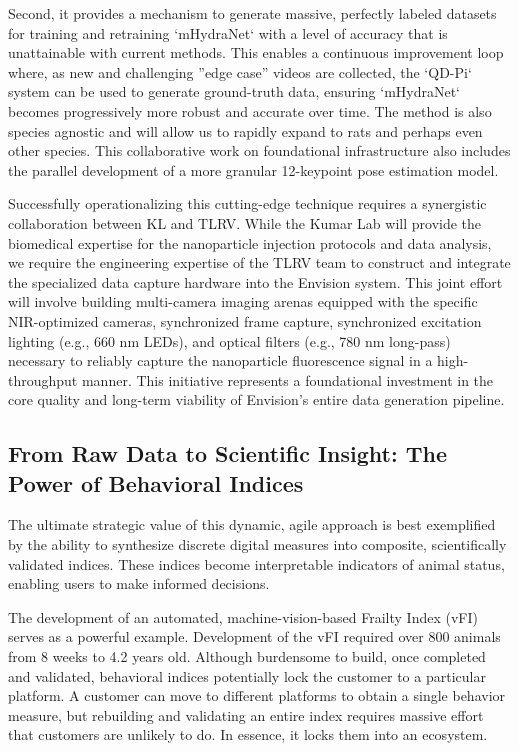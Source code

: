 \documentclass[11pt,a4paper]{article}
\begin{document}
Second, it provides a mechanism to generate massive, perfectly labeled datasets for training and retraining ‘mHydraNet‘ with a level of accuracy that is unattainable with current methods. This enables a continuous improvement loop where, as new and challenging ”edge case” videos are collected, the ‘QD-Pi‘ system can be used to generate ground-truth data, ensuring ‘mHydraNet‘ becomes progressively more robust and accurate over time. The method is also species agnostic and will allow us to rapidly expand to rats and perhaps even other species. This collaborative work on foundational infrastructure also includes the parallel development of a more granular 12-keypoint pose estimation model.

Successfully operationalizing this cutting-edge technique requires a synergistic collaboration between KL and TLRV. While the Kumar Lab will provide the biomedical expertise for the nanoparticle injection protocols and data analysis, we require the engineering expertise of the TLRV team to construct and integrate the specialized data capture hardware into the Envision system. This joint effort will involve building multi-camera imaging arenas equipped with the specific NIR-optimized cameras, synchronized frame capture, synchronized excitation lighting (e.g., 660 nm LEDs), and
optical filters (e.g., 780 nm long-pass) necessary to reliably capture the nanoparticle fluorescence signal in a high-throughput manner. This initiative represents a foundational investment in the core quality and long-term viability of Envision’s entire data generation pipeline.

\subsection{From Raw Data to Scientific Insight: The Power of Behavioral Indices}

The ultimate strategic value of this dynamic, agile approach is best exemplified by the ability to synthesize discrete digital measures into composite, scientifically validated indices. These indices become interpretable indicators of animal status, enabling users to make informed decisions.

The development of an automated, machine-vision-based Frailty Index (vFI) serves as a powerful example. Development of the vFI required over 800 animals from 8 weeks to 4.2 years old. Although burdensome to build, once completed and validated, behavioral  indices potentially lock the customer to a particular platform. A customer can move to different platforms to obtain a single behavior measure, but rebuilding and validating an entire index requires massive effort that customers are unlikely to do. In essence, it locks them into an ecosystem.
\end{document}
